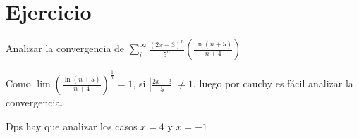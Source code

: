 \documentclass{article}
\begin{document}
\section{Ejercicio}
Analizar la convergencia de $\sum_i^{\infty}
\frac{(2x-3)^n}{5^n}\left(\frac{\ln (n+5)}{n+4}\right)$

Como \(
\lim \left(\frac{\ln(n+5)}{n+4}\right)^\frac{1}{n} = 1
\), si $\left|\frac{2x-3}{5}\right| \neq 1$, luego por cauchy es fácil
analizar la convergencia.

Dps hay que analizar los casos $x = 4$ y $x = -1$
\end{document}
